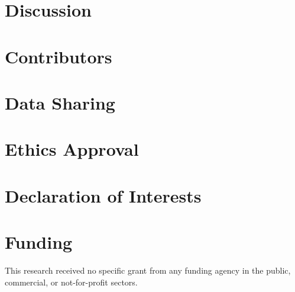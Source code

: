 \documentclass[12pt,nopreprintline]{elsarticle}
\begin{document}
\section{Discussion}


\section*{Contributors}


\section*{Data Sharing}


\section*{Ethics Approval}


\section*{Declaration of Interests}


\section*{Funding}
This research received no specific grant from any funding agency in the public, commercial, or not-for-profit sectors.




\clearpage

\setcounter{section}{0}
\setcounter{table}{0}
\setcounter{figure}{0}
\renewcommand{\thesection}{S\arabic{section}}
\renewcommand{\thesubsection}{S\arabic{section}.\arabic{subsection}}
\renewcommand{\thetable}{S\arabic{table}}
\renewcommand{\thefigure}{S\arabic{figure}}
\renewcommand{\theHsection}{supp.S\arabic{section}}
\renewcommand{\theHsubsection}{supp.S\arabic{section}.\arabic{subsection}}
\renewcommand{\theHsubsubsection}{supp.S\arabic{section}.\arabic{subsection}.\arabic{subsubsection}}
\renewcommand{\theHfigure}{supp.S\arabic{figure}}
\renewcommand{\theHtable}{supp.S\arabic{table}}
\end{document}
